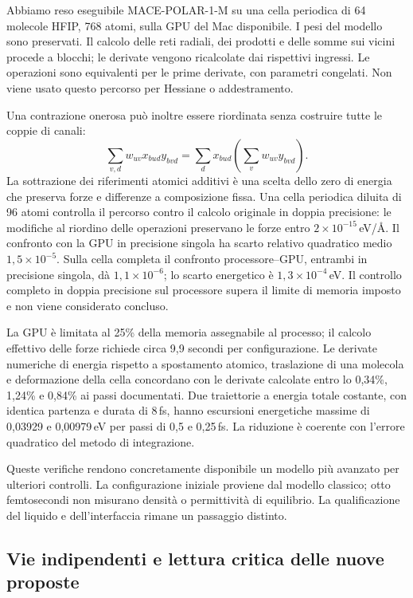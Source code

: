 \documentclass[11pt,reqno]{amsart}
\numberwithin{equation}{section}
\begin{document}
Abbiamo reso eseguibile MACE-POLAR-1-M su una cella periodica
di 64 molecole HFIP, 768 atomi, sulla GPU del Mac disponibile.
I pesi del modello sono preservati. Il calcolo delle reti radiali,
dei prodotti e delle somme sui vicini procede a blocchi;
le derivate vengono ricalcolate dai rispettivi ingressi.
Le operazioni sono equivalenti per le prime derivate, con
parametri congelati. Non viene usato questo percorso per Hessiane
o addestramento.

Una contrazione onerosa pu\`o inoltre essere riordinata senza
costruire tutte le coppie di canali:
\begin{equation}
 \sum_{v,d}w_{uv}x_{bud}y_{bvd}
 =\sum_d x_{bud}\left(\sum_v w_{uv}y_{bvd}\right).
\end{equation}
La sottrazione dei riferimenti atomici additivi \`e una scelta
dello zero di energia che preserva forze e differenze a composizione
fissa. Una cella periodica diluita di 96 atomi controlla il percorso
contro il calcolo originale in doppia precisione: le modifiche
al riordino delle operazioni preservano le forze entro
$2\times10^{-15}$\,eV/\AA. Il confronto con la GPU in precisione singola
ha scarto relativo quadratico medio $1{,}5\times10^{-5}$.
Sulla cella completa il confronto processore--GPU, entrambi in
precisione singola, d\`a $1{,}1\times10^{-6}$; lo scarto energetico
\`e $1{,}3\times10^{-4}$\,eV. Il controllo completo in doppia
precisione sul processore supera il limite di memoria imposto
e non viene considerato concluso.

La GPU \`e limitata al 25\% della memoria assegnabile al processo;
il calcolo effettivo delle forze richiede circa 9,9 secondi
per configurazione. Le derivate numeriche di energia rispetto
a spostamento atomico, traslazione di una molecola e deformazione
della cella concordano con le derivate calcolate entro lo 0,34\%,
1,24\% e 0,84\% ai passi documentati. Due traiettorie a energia
totale costante, con identica partenza e durata di 8\,fs, hanno
escursioni energetiche massime di 0,03929 e 0,00979\,eV per
passi di 0,5 e 0,25\,fs. La riduzione \`e coerente con l'errore
quadratico del metodo di integrazione.

Queste verifiche rendono concretamente disponibile un modello
pi\`u avanzato per ulteriori controlli. La configurazione iniziale
proviene dal modello classico; otto femtosecondi non misurano
densit\`a o permittivit\`a di equilibrio. La qualificazione del
liquido e dell'interfaccia rimane un passaggio distinto.

\subsection{Vie indipendenti e lettura critica delle nuove proposte}
\end{document}
